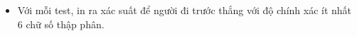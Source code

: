 \begin{itemize}
	\item     Với mỗi test, in ra xác suất để người đi trước thắng với độ chính xác ít nhất 6 chữ số thập phân.   
\end{itemize}